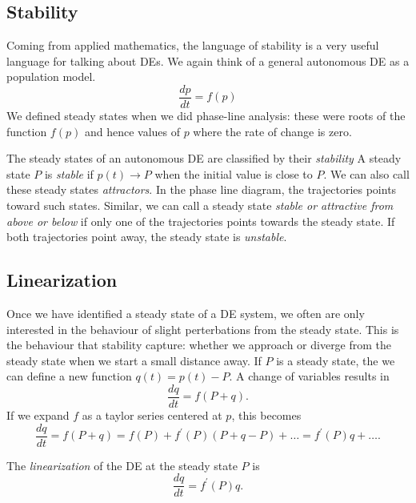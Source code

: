 \documentclass[fleqn,letterpaper]{report}
\begin{document}
\subsection{Stability}
\label{stability}

Coming from applied mathematics, the language of stability is
a very useful language for talking about DEs. We again think
of a general autonomous DE as a population model.
\begin{equation*}
\frac{dp}{dt} = f(p)
\end{equation*}
We defined steady states when we did phase-line analysis:
these were roots of the function $f(p)$ and hence values of
$p$ where the rate of change is zero. 

\begin{defn}
The steady states of an autonomous DE are classified by their
\emph{stability} A steady state $P$ is \emph{stable} if $p(t)
\rightarrow P$ when the initial value is close to $P$. We can
also call these steady states \emph{attractors}. In the phase
line diagram, the trajectories points toward such states.
Similar, we can call a steady state \emph{stable or attractive
from above or below} if only one of the trajectories points
towards the steady state. If both trajectories point away, the
steady state is \emph{unstable}.
\end{defn}

\subsection{Linearization}
\label{linearization}

Once we have identified a steady state of a DE system, we
often are only interested in the behaviour of slight
perterbations from the steady state. This is the behaviour
that stability capture: whether we approach or diverge from
the steady state when we start a small distance away. If
$P$ is a steady state, the we can define a new function $q(t)
= p(t) - P$. A change of variables results in 
\begin{equation*}
\frac{dq}{dt} = f(P + q).
\end{equation*}
If we expand $f$ as a taylor series centered at $p$, this becomes
\begin{equation*}
\frac{dq}{dt} = f(P + q) = f(P) + f^\prime(P) (P+q -P) +
\ldots = f^\prime(P) q + \ldots.
\end{equation*}

\begin{defn}
The \emph{linearization} of the DE at the steady state $P$ is
\begin{equation*}
\frac{dq}{dt} = f^\prime(P) q.
\end{equation*}
\end{defn}
\end{document}
